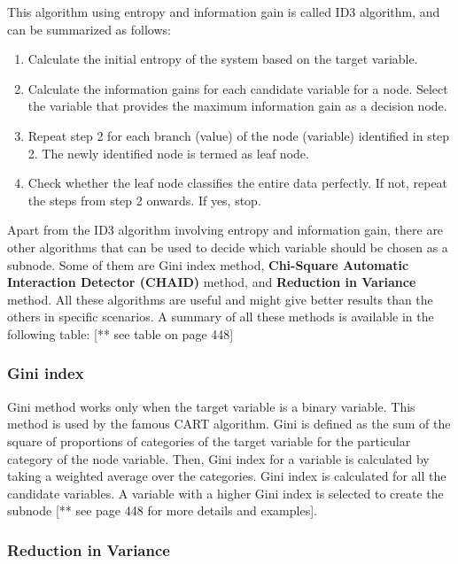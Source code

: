 \documentclass{article}
\numberwithin{equation}{section} %
\begin{document}
This algorithm using entropy and information gain is called ID3 algorithm, and can
be summarized as follows:

\begin{enumerate}
	\item Calculate the initial entropy of the system based on the target variable.
	\item Calculate the information gains for each candidate variable for a
	node. Select the variable that provides the maximum information gain as a
	decision node.
	\item Repeat step 2 for each branch (value) of the node (variable) identified in
	step 2. The newly identified node is termed as leaf node.
	\item Check whether the leaf node classifies the entire data perfectly. If not, repeat the steps from step 2 onwards. If yes, stop.
\end{enumerate}

Apart from the ID3 algorithm involving entropy and information gain, there are other algorithms that can be used to decide which variable should be chosen as a subnode. Some of them are Gini index method, \textbf{Chi-Square Automatic Interaction Detector (CHAID)} method, and \textbf{Reduction in Variance} method. All these algorithms are useful and might give better results than the others in specific scenarios. A summary of all these methods is available in the following table: [** see table on page 448] \\


\subsubsection*{Gini index}

Gini method works only when the target variable is a binary variable. This method is
used by the famous CART algorithm. Gini is defined as the sum of the square of proportions of categories of the target variable for the particular category of the node variable. Then, Gini index for a variable is calculated by taking a weighted average over the categories. Gini index is calculated for all the candidate variables. A variable with a higher Gini index is selected to create the subnode [** see page 448 for more details and examples].


\subsubsection*{Reduction in Variance}
\end{document}
